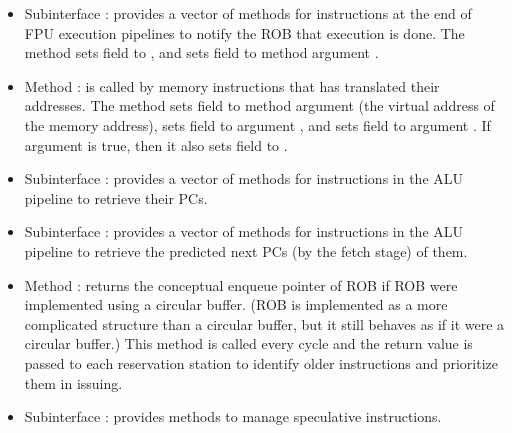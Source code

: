 \begin{itemize}
    \item Subinterface : provides a vector of methods for instructions at the end of FPU execution pipelines to notify the ROB that execution is done.
    The method sets field  to , and sets field  to method argument .
    
    \item Method : is called by memory instructions that has translated their addresses.
    The method sets field  to method argument  (the virtual address of the memory address), sets field  to argument , and sets field  to argument .
    If argument  is true, then it also sets field  to .
    
    \item Subinterface : provides a vector of methods for instructions in the ALU pipeline to retrieve their PCs.
    
    \item Subinterface : provides a vector of methods for instructions in the ALU pipeline to retrieve the predicted next PCs (by the fetch stage) of them.
    
    \item Method : returns the conceptual enqueue pointer of ROB if ROB were implemented using a circular buffer.
    (ROB is implemented as a more complicated structure than a circular buffer, but it still behaves as if it were a circular buffer.)
    This method is called every cycle and the return value is passed to each reservation station to identify older instructions and prioritize them in issuing.
    
    \item Subinterface : provides methods to manage speculative instructions.
\end{itemize}

